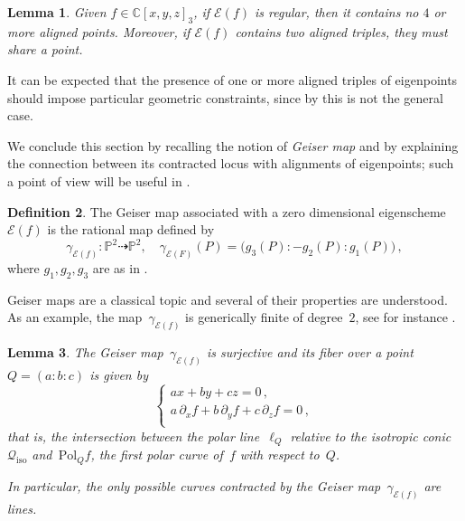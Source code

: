 \documentclass[a4paper, 11pt, reqno]{amsart}
\theoremstyle{plain}
\newtheorem{lemma}{Lemma}[section]
\theoremstyle{definition}
\newtheorem{definition}[lemma]{Definition}
\newcommand{\C}{\mathbb{C}}
\newcommand{\p}{\mathbb{P}}
\newcommand{\iso}{\mathcal{Q}_{\mathrm{iso}}}
\newcommand{\Eig}[1]{\mathcal{E}\!\left( {#1} \right)}
\begin{document}
\begin{lemma}
    \label{lemma: no 4 aligned}
    Given $f \in \C[x,y,z]_3$,
if $\Eig{f}$ is regular, then it contains no $4$ or more aligned points. Moreover, if $\Eig{f}$ contains two aligned triples, they must share a point.
\end{lemma}


It can be expected that the presence of one or more aligned triples of eigenpoints should impose particular geometric constraints, since by \cite[Theorem 5.7]{BGV} this is not the general case.

We conclude this section by recalling the notion of \emph{Geiser map} and by explaining the connection between its contracted locus with alignments of eigenpoints; such a point of view  will be useful in .

\begin{definition}
The Geiser map associated with a zero dimensional eigenscheme $\Eig{f}$ is the rational map defined by
%
\[
  \gamma_{\Eig{f}} \colon \p ^2 \dasharrow \p^2, \quad
  \gamma_{\Eig{F}} (P) = \bigl( g_3(P):-g_2(P):g_1(P) \bigr) \,,
\]
%
where $g_1, g_2, g_3$ are as in .
\end{definition}

Geiser maps are a classical topic and several of their properties are understood.
As an example, the map~$\gamma_{\Eig{f}}$ is generically finite of degree~$2$, see for instance \cite[Section~8.7.2]{Dolgachev}.

\begin{lemma}
The Geiser map~$\gamma_{\Eig{f}}$ is surjective and its fiber over a point $Q = (a:b:c)$ is given by
%
\begin{equation}
\label{eq:fibers}
  \left\{
  \begin{array}{l}
    a x + by + cz = 0 \,, \\[2pt]
    a \, \partial_x f + b \, \partial_y f + c \, \partial_z f = 0 \,,\\
  \end{array}
  \right.
\end{equation}
%
that is, the intersection between the polar line~$\ell_Q$ relative to the isotropic conic~$\iso$ and~$\mathrm{Pol}_Q f$, the
first polar curve of~$f$ with respect to~$Q$.

In particular, the only possible curves contracted by the Geiser map~$\gamma_{\Eig{f}}$ are lines.
\end{lemma}
\end{document}
